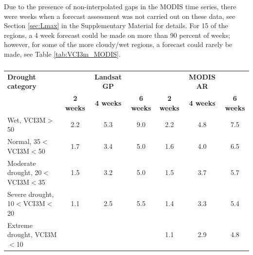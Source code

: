 \documentclass[review]{elsarticle}
\begin{document}
Due to the presence of non-interpolated gaps in the MODIS time series, there were weeks when a forecast assessment was not carried out on these data, see Section \ref{sec:Lmax} in the Supplementary Material for details.  For 15 of the regions, a 4 week forecast could be made on more than 90 percent of weeks; however, for some of the more cloudy/wet regions, a forecast could rarely be made, see Table \ref{tab:VCI3m_MODIS}.


\begin{table}
	\small
	\caption{ } \label{tab:RMScategories}
	\centering
	\begin{tabular}{l|ccc|ccc} 
		\toprule
		\textbf{Drought category} & & \textbf{Landsat GP} & & &\textbf{MODIS AR} \\
		& \textbf{2 weeks} & \textbf{4 weeks} & \textbf{6 weeks} & \textbf{2 weeks} & \textbf{4 weeks} & \textbf{6 weeks} \\
		\midrule
		Wet, VCI3M$>$50 & 2.2 & 5.3 & 9.0 &2.2& 4.8& 7.5\\
		Normal, 35$<$VCI3M$<$50 & 1.7 & 3.4 & 5.0 &1.6& 4.0& 6.5 \\
		Moderate drought, 20$<$VCI3M$<$35& 1.5 &3.2 & 5.0&1.5&3.7& 5.7\\
		Severe drought, 10$<$VCI3M$<$20& 1.1 &2.5 &5.5&1.4& 3.3& 5.4\\
		Extreme drought, VCI3M$<$10  & &&& 1.1 & 2.9   & 4.8         \\
		\bottomrule
	\end{tabular}
\end{table}

\end{document}
